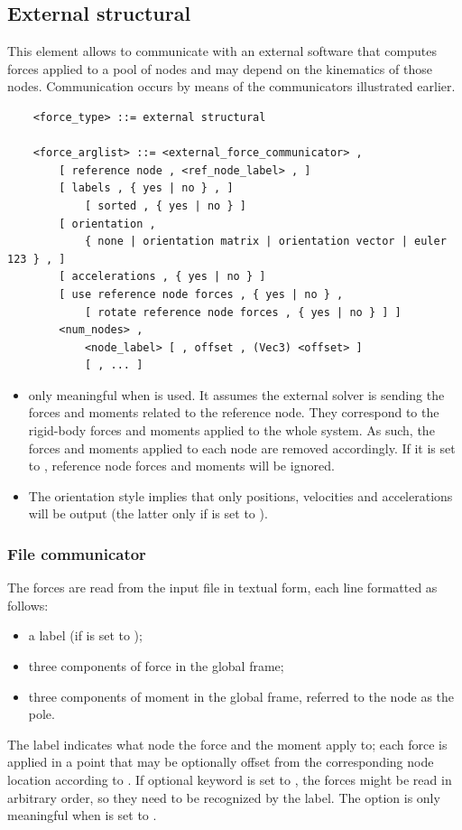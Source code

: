 \subsection{External structural}
\label{sec:EL:FORCE:EXTERNAL:STRUCTURAL}
This element allows to communicate with an external software that computes
forces applied to a pool of nodes and may depend on the kinematics of those
nodes.
Communication occurs by means of the communicators illustrated earlier.
\begin{verbatim}
    <force_type> ::= external structural

    <force_arglist> ::= <external_force_communicator> ,
        [ reference node , <ref_node_label> , ]
        [ labels , { yes | no } , ]
            [ sorted , { yes | no } ]
        [ orientation ,
            { none | orientation matrix | orientation vector | euler 123 } , ]
        [ accelerations , { yes | no } ]
        [ use reference node forces , { yes | no } ,
            [ rotate reference node forces , { yes | no } ] ]
        <num_nodes> ,
            <node_label> [ , offset , (Vec3) <offset> ]
            [ , ... ]
\end{verbatim}
\begin{itemize}
\item {} only meaningful
when  is used.
It assumes the external solver is sending the forces and moments
related to the reference node.
They correspond to the rigid-body forces and moments applied
to the whole system.
As such, the forces and moments applied to each node
are removed accordingly.
If it is set to , reference node forces and moments
will be ignored.

\item The orientation style  implies that only positions, velocities 
and accelerations will be output (the latter only if 
is set to ).
\end{itemize}


\subsubsection{File communicator}
The forces are read from the input file in textual form,
each line formatted as follows:
\begin{itemize}
\item a label (if  is set to );
\item three components of force in the global frame;
\item three components of moment in the global frame,
	referred to the node as the pole.
\end{itemize}
The label indicates what node the force and the moment apply to; 
each force is applied in a point that may be optionally offset 
from the corresponding node location according to .
If optional keyword  is set to , the forces might be
read in arbitrary order, so they need to be recognized by the label.
The option  is only meaningful when  is set to .

